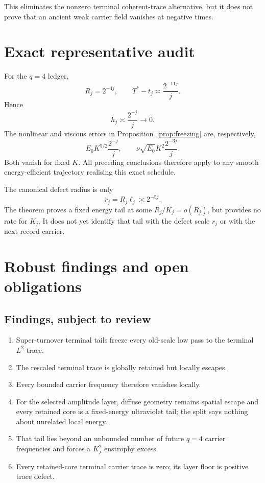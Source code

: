\documentclass[11pt]{article}
\theoremstyle{remark}
\begin{document}
This eliminates the nonzero terminal coherent-trace alternative, but it
does not prove that an ancient weak carrier field vanishes at negative
times.

\section{Exact representative audit}

For the \(q=4\) ledger,
\[
 R_j=2^{-4j},
 \qquad
 T^*-t_j\asymp\frac{2^{-11j}}j.
\]
Hence
\[
 h_j\asymp\frac{2^{-j}}j\longrightarrow0.
\]
The nonlinear and viscous errors in Proposition~\ref{prop:freezing} are,
respectively,
\[
 E_0K^{5/2}\frac{2^{-j}}j,
 \qquad
 \nu\sqrt{E_0}K^2\frac{2^{-3j}}j.
\]
Both vanish for fixed \(K\).  All preceding conclusions therefore apply to
any smooth energy-efficient trajectory realising this exact schedule.

The canonical defect radius is only
\[
 r_j=R_j\ell_j\asymp2^{-5j}.
\]
The theorem proves a fixed energy tail at some \(R_j/K_j=o(R_j)\), but
provides no rate for \(K_j\).  It does not yet identify that tail with the
defect scale \(r_j\) or with the next record carrier.

\section{Robust findings and open obligations}

\subsection*{Findings, subject to review}

\begin{enumerate}
\item Super-turnover terminal tails freeze every old-scale low pass to the
terminal \(L^2\) trace.
\item The rescaled terminal trace is globally retained but locally escapes.
\item Every bounded carrier frequency therefore vanishes locally.
\item For the selected amplitude layer, diffuse geometry remains spatial
escape and every retained core is a fixed-energy ultraviolet tail; the
split says nothing about unrelated local energy.
\item That tail lies beyond an unbounded number of future \(q=4\) carrier
frequencies and forces a \(K_j^2\) enstrophy excess.
\item Every retained-core terminal carrier trace is zero; its layer floor is
positive trace defect.
\end{enumerate}
\end{document}
